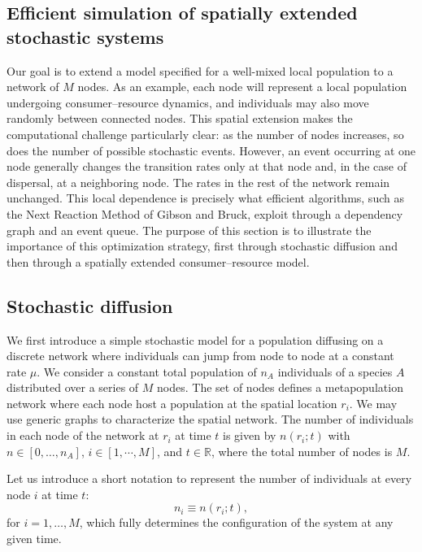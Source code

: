 \subsection{Efficient simulation of spatially extended stochastic systems}
\label{space}
Our goal is to extend a model specified for a well-mixed local population to a network of $M$ nodes. As an example, each node will represent a local population undergoing consumer--resource dynamics, and individuals may also move randomly between connected nodes. This spatial extension makes the computational challenge particularly clear: as the number of nodes increases, so does the number of possible stochastic events. However, an event occurring at one node generally changes the transition rates only at that node and, in the case of dispersal, at a neighboring node. The rates in the rest of the network remain unchanged. This local dependence is precisely what efficient algorithms, such as the Next Reaction Method of Gibson and Bruck, exploit through a dependency graph and an event queue. The purpose of this section is to illustrate the importance of this optimization strategy, first through stochastic diffusion and then through a spatially extended consumer--resource model.
\smallskip
   
\subsection*{{\bfseries Stochastic diffusion}}   
 We first introduce a simple stochastic model for a population diffusing on a discrete network where individuals can jump from node to node at a constant rate $\mu$. We consider a constant total population of $n_A$ individuals of a species $A$ distributed over a series of $M$ nodes. The set of nodes defines a metapopulation network where each node host a population at the spatial location $r_i$. We may use generic graphs to characterize the spatial network. The number of individuals in each node of the network at $r_i$ at time $t$ is given by $n(r_i;t)$ with $n \in [0, \dots, n_A]$, $i \in [1,\cdots,M]$, and $t \in \mathbb{R}$, where the total number of nodes is $M$.
\smallskip

Let us introduce a short notation to represent the number of individuals at every node $i$ at time $t$:
\begin{equation}
n_i \equiv n(r_i;t),
\label{eq:spatial_state}
\end{equation}
for $i=1, \dots, M$, which fully determines the configuration of the system at any given time. 
\smallskip

